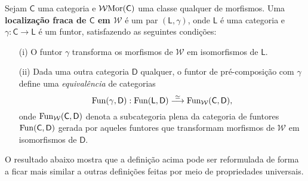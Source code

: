 \begin{defin}\label{defin:localizacao_fraca}
  Sejam $\mathsf{C}$ uma categoria e $\mathcal{W} \mathrm{Mor}(\mathsf{C})$ uma classe qualquer de morfismos.
  Uma \textbf{localização fraca de $\mathsf{C}$ em $\mathcal{W}$} é um par $(\mathsf{L},\gamma)$, onde $\mathsf{L}$ é uma categoria e $\gamma: \mathsf{C} \to \mathsf{L}$ é um funtor, satisfazendo as seguintes condições:
  \begin{enumerate}
  \item[(i)] O funtor $\gamma$ transforma os morfismos de $\mathcal{W}$ em isomorfismos de $\mathsf{L}$.
    
  \item[(ii)] Dada uma outra categoria $\mathsf{D}$ qualquer, o funtor de pré-composição com $\gamma$ define uma \emph{equivalência} de categorias
    \begin{displaymath}
      \mathrm{Fun}(\gamma,\mathsf{D}): \mathrm{Fun}(\mathsf{L},\mathsf{D}) \overset{\simeq}{\longrightarrow} \mathrm{Fun}_{\mathcal{W}}(\mathsf{C},\mathsf{D}),
    \end{displaymath}
    onde $\mathrm{Fun}_{\mathcal{W}}(\mathsf{C},\mathsf{D})$ denota a subcategoria plena da categoria de funtores $\mathrm{Fun}(\mathsf{C},\mathsf{D})$ gerada por aqueles funtores que transformam morfismos de $\mathcal{W}$ em isomorfismos de $\mathsf{D}$.
  \end{enumerate}
\end{defin}

O resultado abaixo mostra que a definição acima pode ser reformulada de forma a ficar mais similar a outras definições feitas por meio de propriedades universais.

